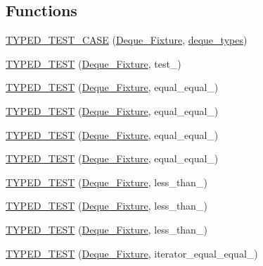 \subsection*{Functions}
\begin{DoxyCompactItemize}
\item 
\hyperlink{TestDeque_8c_09_09_a79c5f0d583b012a972111954cd22db81}{T\-Y\-P\-E\-D\-\_\-\-T\-E\-S\-T\-\_\-\-C\-A\-S\-E} (\hyperlink{structDeque__Fixture}{Deque\-\_\-\-Fixture}, \hyperlink{TestDeque_8c_09_09_a44a3d805a5bc19d6bc402da26200d63d}{deque\-\_\-types})
\item 
\hyperlink{TestDeque_8c_09_09_a2729a50d5ca3edae9f1725a4263c7270}{T\-Y\-P\-E\-D\-\_\-\-T\-E\-S\-T} (\hyperlink{structDeque__Fixture}{Deque\-\_\-\-Fixture}, test\-\_)
\item 
\hyperlink{TestDeque_8c_09_09_a632ef8b3e22a152792ad0277db1f44df}{T\-Y\-P\-E\-D\-\_\-\-T\-E\-S\-T} (\hyperlink{structDeque__Fixture}{Deque\-\_\-\-Fixture}, equal\-\_\-equal\-\_)
\item 
\hyperlink{TestDeque_8c_09_09_a10e556eadf8bdb77d10d5f67e12f0c54}{T\-Y\-P\-E\-D\-\_\-\-T\-E\-S\-T} (\hyperlink{structDeque__Fixture}{Deque\-\_\-\-Fixture}, equal\-\_\-equal\-\_)
\item 
\hyperlink{TestDeque_8c_09_09_a2a3ce9885136f491a519d6de0ada2011}{T\-Y\-P\-E\-D\-\_\-\-T\-E\-S\-T} (\hyperlink{structDeque__Fixture}{Deque\-\_\-\-Fixture}, equal\-\_\-equal\-\_)
\item 
\hyperlink{TestDeque_8c_09_09_a51ee15ba041bc8bc0a2965fadfc518cc}{T\-Y\-P\-E\-D\-\_\-\-T\-E\-S\-T} (\hyperlink{structDeque__Fixture}{Deque\-\_\-\-Fixture}, equal\-\_\-equal\-\_)
\item 
\hyperlink{TestDeque_8c_09_09_a14ee5b56292abcd13cbeec88870b7ec9}{T\-Y\-P\-E\-D\-\_\-\-T\-E\-S\-T} (\hyperlink{structDeque__Fixture}{Deque\-\_\-\-Fixture}, less\-\_\-than\-\_)
\item 
\hyperlink{TestDeque_8c_09_09_a1ac908f97803d882d7c2d9eb41ae6d87}{T\-Y\-P\-E\-D\-\_\-\-T\-E\-S\-T} (\hyperlink{structDeque__Fixture}{Deque\-\_\-\-Fixture}, less\-\_\-than\-\_)
\item 
\hyperlink{TestDeque_8c_09_09_a69a341088956db00c64ce60aaa2ddf82}{T\-Y\-P\-E\-D\-\_\-\-T\-E\-S\-T} (\hyperlink{structDeque__Fixture}{Deque\-\_\-\-Fixture}, less\-\_\-than\-\_)
\item 
\hyperlink{TestDeque_8c_09_09_ad120cdf18c48ad09ba36d8a9f5d506a1}{T\-Y\-P\-E\-D\-\_\-\-T\-E\-S\-T} (\hyperlink{structDeque__Fixture}{Deque\-\_\-\-Fixture}, iterator\-\_\-equal\-\_\-equal\-\_)
\item 

\end{DoxyCompactItemize}
